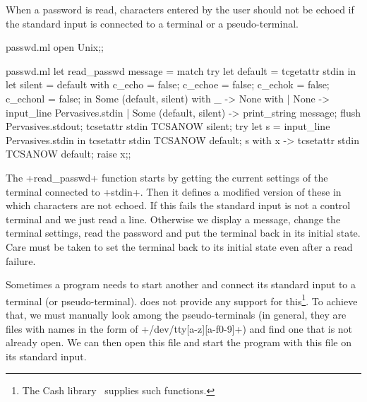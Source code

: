 \begin{example}
When a password is read, characters entered by the user should not be
echoed if the standard input is connected to a terminal or a
pseudo-terminal.
%
\begin{codefile}{passwd.ml}
open Unix;;
\end{codefile}
%
\begin{listingcodefile}{passwd.ml}
let read_passwd message = 
  match
    try 
      let default = tcgetattr stdin in
      let silent = 
        { default with 
          c_echo = false; 
          c_echoe = false; 
          c_echok = false; 
          c_echonl = false; 
        } in
      Some (default, silent) 
    with _ -> None
  with 
  | None -> input_line Pervasives.stdin
  | Some (default, silent) -> 
      print_string message; 
      flush Pervasives.stdout;
      tcsetattr stdin TCSANOW silent;
      try 
        let s = input_line Pervasives.stdin in 
        tcsetattr stdin TCSANOW default; s
      with x -> 
        tcsetattr stdin TCSANOW default; raise x;;
\end{listingcodefile}
% 
The \ml+read_passwd+ function starts by getting the current settings
of the terminal connected to \ml+stdin+. Then it defines a modified
version of these in which characters are not echoed. If this fails the
standard input is not a control terminal and we just read a
line. Otherwise we display a message, change the terminal settings, read the
password and put the terminal back in its initial state. Care must be
taken to set the terminal back to its initial state even after a read
failure.
\end{example}
% 
Sometimes a program needs to start another and connect its standard input
to a terminal (or pseudo-terminal). {\ocaml} does not provide any
support for this\footnote {The Cash library~\cite {Cash} supplies
  such functions.}. To achieve that, we must manually look among the
pseudo-terminals (in general, they are files with names in the form of
\ml+/dev/tty[a-z][a-f0-9]+) and find one that is not already open. We
can then open this file and start the program with this file on its
standard input.

